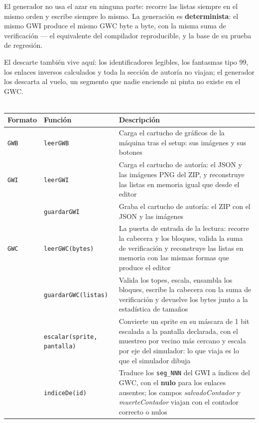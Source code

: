 El generador no usa el azar en ninguna parte: recorre las listas
siempre en el mismo orden y escribe siempre lo mismo. La generación
es \textbf{determinista}: el mismo GWI produce el mismo GWC byte a
byte, con la misma suma de verificación — el equivalente del
compilador reproducible, y la base de su prueba de regresión.

El descarte también vive aquí: los identificadores legibles, los
fantasmas tipo 99, los enlaces inversos calculados y toda la sección
de autoría no viajan; el generador los descarta al vuelo, un
segmento que nadie enciende ni pinta no existe en el GWC.\\\

\begin{table}[H]
	\centering
	\begin{tabularx}{\textwidth}{@{}l l X@{}}
		\toprule
		\textbf{Formato} & \textbf{Función} & \textbf{Descripción} \\
		\midrule
		
		\texttt{GWB} & \texttt{leerGWB} & Carga el cartucho de gráficos de
		la máquina tras el setup: sus imágenes y sus botones \\
		\midrule
		
		\texttt{GWI} & \texttt{leerGWI} & Carga el cartucho de autoría: el
		JSON y las imágenes PNG del ZIP, y reconstruye las listas en
		memoria igual que desde el editor \\
		
		& \texttt{guardarGWI} & Graba el cartucho de autoría: el ZIP con el JSON y las
		imágenes \\
		\midrule
		
		\texttt{GWC} & \texttt{leerGWC(bytes)} & La puerta de entrada de la lectura:
		recorre la cabecera y los bloques, valida la suma de
		verificación y reconstruye las listas en memoria con las
		mismas formas que produce el editor \\
		
		& \texttt{guardarGWC(listas)} & Valida los topes, escala, ensambla los bloques, escribe la cabecera con la suma de verificación y devuelve los bytes junto a la estadística de tamaños \\
		
		& \texttt{escalar(sprite, pantalla)} & Convierte un sprite en su
		máscara de 1 bit escalada a la pantalla declarada, con el
		muestreo por vecino más cercano y escala por eje del
		simulador: lo que viaja es lo que el simulador dibuja \\
		
		& \texttt{indiceDe(id)} & Traduce los \texttt{seg\_NNN} del GWI a
		índices del GWC, con el \textbf{nulo} para los enlaces
		ausentes; los campos \emph{salvadoContador} y
		\emph{muerteContador} viajan con el contador correcto o nulos \\
		

\end{tabularx}
\end{table}

